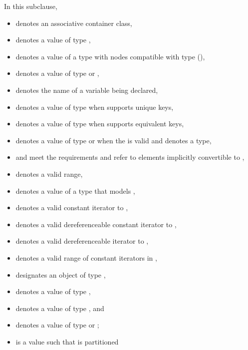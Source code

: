\pnum
In this subclause,
\begin{itemize}
\item
{} denotes an associative container class,
\item
{} denotes a value of type ,
\item
{} denotes a value of a type with nodes compatible with type
 (),
\item
{} denotes a value of type  or ,
\item
{} denotes the name of a variable being declared,
\item
{} denotes a value of type 
when  supports unique keys,
\item
{} denotes a value of type 
when  supports equivalent keys,
\item
{} denotes a value of type  or 
when the 
 is valid
and denotes a type,
\item
{} and 
meet the  requirements and refer to elements
implicitly convertible to
,
\item
{} denotes a valid range,
\item
{} denotes a value of a type 
that models ,
\item
{} denotes a valid constant iterator to ,
\item
{} denotes a valid dereferenceable constant iterator to ,
\item
{} denotes a valid dereferenceable iterator to ,
\item
{} denotes a valid range of constant iterators in ,
\item
{} designates an object of type ,
\item
{} denotes a value of type ,
\item
{} denotes a value of type , and
\item
{} denotes a value of type  or ;
\item
{} is a value such that  is partitioned

\end{itemize}
